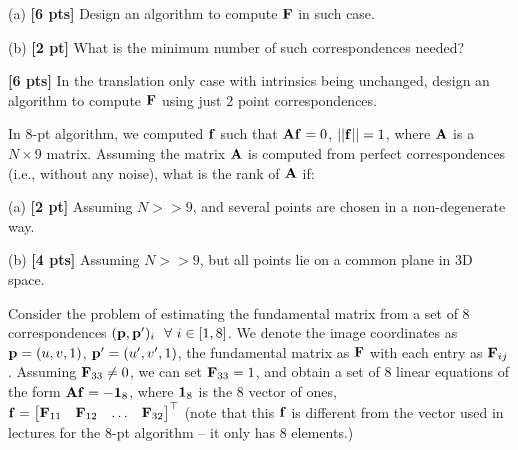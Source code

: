 \begin{questions}
    (a) \textbf{[6 pts]} Design an algorithm to compute $\mathbf{F}$ in such case.

    \begin{tcolorbox}[fit,height=12cm, width=\textwidth, blank, borderline={0.5pt}{-2pt},halign=left, valign=center, nobeforeafter]


    \end{tcolorbox}

    (b) \textbf{[2 pt]} What is the minimum number of such correspondences needed?

    \begin{tcolorbox}[fit,height fill, width=\textwidth, blank, borderline={0.5pt}{-2pt},halign=left, valign=center, nobeforeafter]


    \end{tcolorbox}

    \question \textbf{[6 pts]} In the translation only case with intrinsics being unchanged, design an algorithm to compute $\mathbf{F}$ using just $2$ point correspondences.

    \begin{tcolorbox}[fit,height fill, width=\textwidth, blank, borderline={0.5pt}{-2pt},halign=left, valign=center, nobeforeafter]


    \end{tcolorbox}

    \clearpage

    \question In $8$-pt algorithm, we computed $\mathbf{f}$ such that $\mathbf{A}\mathbf{f} = 0$, $||\mathbf{f}|| = 1$, where $\mathbf{A}$ is a $N \times 9$ matrix. Assuming the matrix $\mathbf{A}$ is computed from perfect correspondences (i.e., without any noise), what is the rank of $\mathbf{A}$ if:

    (a) \textbf{[2 pt]} Assuming $N >> 9$, and several points are chosen in a non-degenerate way.

    \begin{tcolorbox}[fit,height=9cm, width=\textwidth, blank, borderline={0.5pt}{-2pt},halign=left, valign=center, nobeforeafter]
    \end{tcolorbox}

    (b) \textbf{[4 pts]} Assuming $N >> 9$, but all points lie on a common plane in 3D space.

    \begin{tcolorbox}[fit,height fill, width=\textwidth, blank, borderline={0.5pt}{-2pt},halign=left, valign=center, nobeforeafter]
    \end{tcolorbox}

    \question Consider the problem of estimating the fundamental matrix from a set of 8 correspondences $(\mathbf{p}, \mathbf{p}^\prime)_i~~\forall~ i \in [1, 8]$. We denote the image coordinates as $\mathbf{p} = (u, v, 1)$, $\mathbf{p}' = (u', v', 1)$, the fundamental matrix as $\mathbf{F}$ with each entry as $\mathbf{F}_{ij}$. Assuming $\mathbf{F}_{33} \neq 0$, we can set $\mathbf{F}_{33} = 1$, and obtain a set of 8 linear equations of the form $\mathbf{A} \mathbf{f} = -\boldsymbol{1}_8$, where $\boldsymbol{1}_8$ is the 8 vector of ones, $\mathbf{f} = \begin{bmatrix} \mathbf{F}_{11} & \mathbf{F}_{12} & \dots & \mathbf{F}_{32} \end{bmatrix}^\top$ (note  that this $\mathbf{f}$ is different from the vector used in lectures for the 8-pt algorithm -- it only has 8 elements.)


\end{questions}
